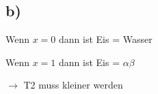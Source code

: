 

\subsection*{b)}

Wenn $x = 0$ dann ist Eis = Wasser

Wenn $x = 1$ dann ist Eis = \(\alpha \beta\)

\(\rightarrow\) T2 muss kleiner werden